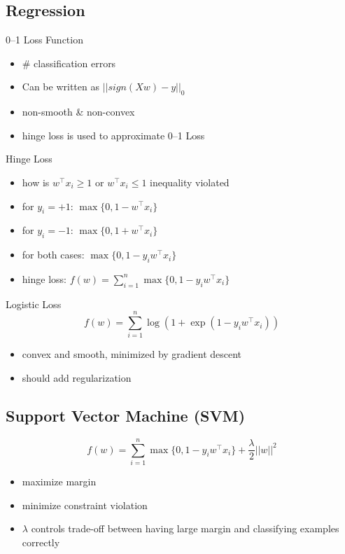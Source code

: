 \documentclass[10pt,landscape,a4paper]{article}
\begin{document}
\begin{multicols*}{5}
\subsection{Regression}
0--1 Loss Function
\begin{itemize}
    \item \# classification errors
    \item Can be written as \(||sign(Xw) - y||_0\)
    \item non-smooth \& non-convex
    \item hinge loss is used to approximate 0--1 Loss
\end{itemize}
Hinge Loss
\begin{itemize}
    \item how is \(w^\intercal x_i \geq 1\) or \(w^\intercal x_i \leq 1\) inequality violated
    \item for \(y_i=+1\): \(\max{\{0,1-w^\intercal x_i\}}\)
    \item for \(y_i=-1\): \(\max{\{0,1+w^\intercal x_i\}}\)
    \item for both cases: \(\max{\{0,1-y_i w^\intercal x_i\}}\)
    \item hinge loss: \(f(w)=\sum_{i=1}^{n}\max{\{0,1-y_i w^\intercal x_i\}}\)
\end{itemize}
Logistic Loss
\begin{dmath*}
    f(w) = \sum_{i=1}^{n}\log{(1+\exp{(1-y_i w^\intercal x_i)})}
\end{dmath*}
\begin{itemize}
    \item convex and smooth, minimized by gradient descent
    \item should add regularization
\end{itemize}

\subsection{Support Vector Machine (SVM)}
\begin{dmath*}
    f(w)=\sum_{i=1}^{n}\max{\{0,1-y_i w^\intercal x_i\}} + \frac{\lambda}{2}||w||^2
\end{dmath*}
\begin{itemize}
    \item maximize margin
    \item minimize constraint violation
    \item \(\lambda  \) controls trade-off between having large margin and classifying examples correctly
\end{itemize}


\end{multicols*}
\end{document}

